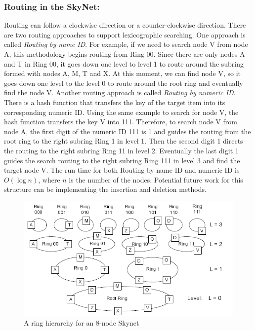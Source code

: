 \documentclass[oribibl]{llncs}
\begin{document}
\subsubsection{Routing in the SkyNet:}

Routing can follow a clockwise direction or a counter-clockwise direction. There are two routing approaches to support lexicographic searching. One approach is called {\it Routing by name ID}. For example, if we need to search node V from node A, this methodology begins routing from Ring 00. Since there are only nodes A and T in Ring 00, it goes down one level to level 1 to route around the subring formed with nodes A, M, T and X. At this moment, we can find node V, so it goes down one level to the level 0 to route around the root ring and eventually find the node V. Another routing approach is called {\it Routing by numeric ID}. There is a hash function that transfers the key of the target item into its corresponding numeric ID. Using the same example to search for node V, the hash function transfers the key V into 111. Therefore, to search node V from node A, the first digit of the numeric ID 111 is 1 and guides the routing from the root ring to the right subring Ring 1 in level 1. Then the second digit 1 directs the routing to the right subring Ring 11 in level 2. Eventually the last digit 1 guides the search routing to the right subring Ring 111 in level 3 and find the target node V. The run time for both Routing by name ID and numeric ID is $O(\log{n})$, where $n$ is the number of the nodes.  Potential future work for this structure can be implementing the insertion and deletion methods.

\begin{figure}[here]
\center
\includegraphics[width=12cm]{images/skynet1}
\caption{A ring hierarchy for an 8-node Skynet}
\label{fig:skynet1}
\end{figure}
\end{document}
